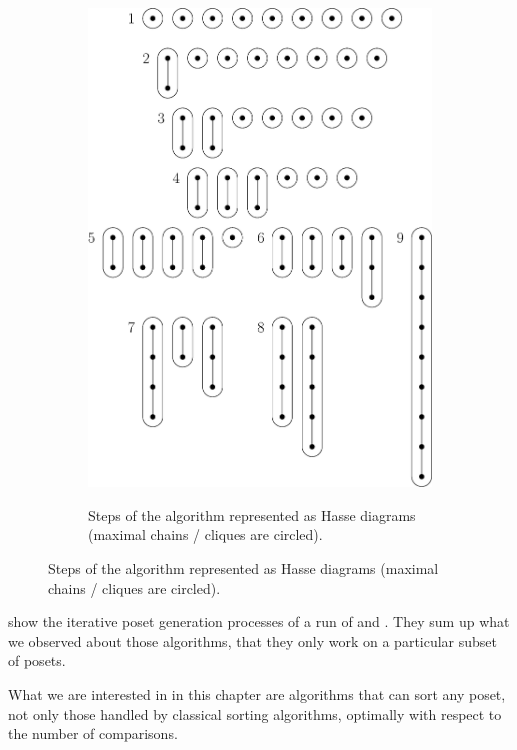 \begin{figure}
\begin{subfigure}[b]{0.4\textwidth}
{\includegraphics[width=\textwidth]{fig/supi/mergesort}} \caption{Steps of the
\mergesort algorithm represented as Hasse diagrams (maximal chains / cliques are
circled).} \label{fig:supi:mergesort} \end{subfigure} \end{figure}


 show the iterative poset
generation processes of a run of \quicksort and \mergesort. They sum up what we
observed about those algorithms, that they only work on a particular subset of
posets.

What we are interested in in this chapter are algorithms that can sort any
poset, \ie not only those handled by classical sorting algorithms, optimally
with respect to the number of comparisons.
